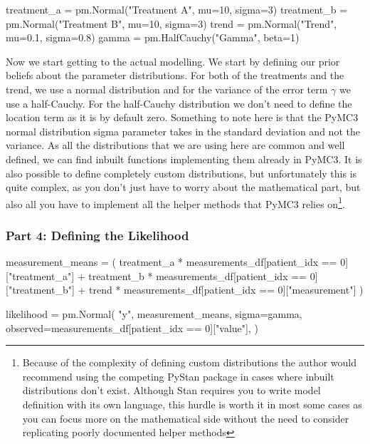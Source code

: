 \documentclass[12pt,a4paper,leqno]{report}
\theoremstyle{plain}
\theoremstyle{definition}
\theoremstyle{remark}
\begin{document}
\bigskip
\begin{pyverbatim}[][fontsize=\footnotesize]
    treatment_a = pm.Normal("Treatment A", mu=10, sigma=3)
    treatment_b = pm.Normal("Treatment B", mu=10, sigma=3)
    trend = pm.Normal("Trend", mu=0.1, sigma=0.8)
    gamma = pm.HalfCauchy("Gamma", beta=1)
\end{pyverbatim}
\smallskip

Now we start getting to the actual modelling. We start by defining our prior beliefs about
the parameter distributions. For both of the treatments and the trend, we use a normal distribution and
for the variance of the error term \(\gamma \) we use a half-Cauchy. For the half-Cauchy
distribution we don't need to define the location term as it is by default zero.
Something to note here is that the PyMC3 normal distribution sigma
parameter takes in the standard deviation and not the variance. As all the distributions
that we are using here are common and well defined, we can find inbuilt functions implementing
them already in PyMC3. It is also possible to define completely custom
distributions, but unfortunately this is quite complex, as you don't just have to worry
about the mathematical part, but also all you have to implement all the helper methods that PyMC3
relies on\footnote{Because of the complexity of defining
custom distributions the author would recommend using the competing PyStan package in
cases where inbuilt distributions don't exist. Although Stan requires you to write
model definition with its own language, this hurdle is worth it in most some cases as you can focus
more on the mathematical side without the need to consider replicating poorly documented helper methods}.

\subsubsection*{Part 4: Defining the Likelihood}

\bigskip
\begin{pyverbatim}[][fontsize=\footnotesize]
    measurement_means = (
        treatment_a
        * measurements_df[patient_idx == 0]["treatment_a"]
        + treatment_b
        * measurements_df[patient_idx == 0]["treatment_b"]
        + trend
        * measurements_df[patient_idx == 0]["measurement"]
    )

    likelihood = pm.Normal(
        "y",
        measurement_means,
        sigma=gamma,
        observed=measurements_df[patient_idx == 0]["value"],
    )
\end{pyverbatim}
\smallskip
\end{document}
